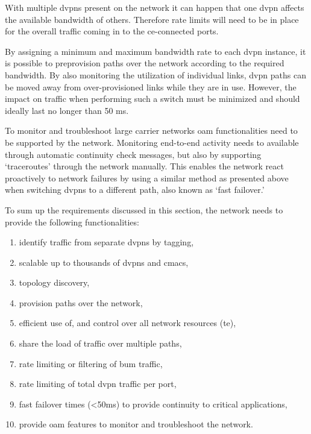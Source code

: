 With multiple \acp{dvpn} present on the network it can happen that one \ac{dvpn} affects the available bandwidth of others. Therefore rate limits will need to be in place for the overall traffic coming in to the \ac{ce}-connected ports. 

By assigning a minimum and maximum bandwidth rate to each \ac{dvpn} instance, it is possible to preprovision paths over the network according to the required bandwidth. By also monitoring the utilization of individual links, \ac{dvpn} paths can be moved away from over-provisioned links while they are in use. However, the impact on traffic when performing such a switch must be minimized and should ideally last no longer than 50 ms.

To monitor and troubleshoot large carrier networks \ac{oam} functionalities need to be supported by the network. Monitoring end-to-end activity needs to available through automatic continuity check messages, but also by supporting `traceroutes' through the network manually. This enables the network react proactively to network failures by using a similar method as presented above when switching \acp{dvpn} to a different path, also known as `fast failover.'

To sum up the requirements discussed in this section, the network needs to provide the following functionalities:

\begin{enumerate}
	\item identify traffic from separate \acp{dvpn} by tagging, 
	\item scalable up to thousands of \acp{dvpn} and \acsp{cmac},
	\item topology discovery, 
	\item provision paths over the network,
	\item efficient use of, and control over all network resources (\ac{te}),
	\item share the load of traffic over multiple paths,
	\item rate limiting or filtering of \ac{bum} traffic,
	\item rate limiting of total \ac{dvpn} traffic per port,
	\item fast failover times (<50ms) to provide continuity to critical applications,
	\item provide \acl{oam} features to monitor and troubleshoot the network.
\end{enumerate}

